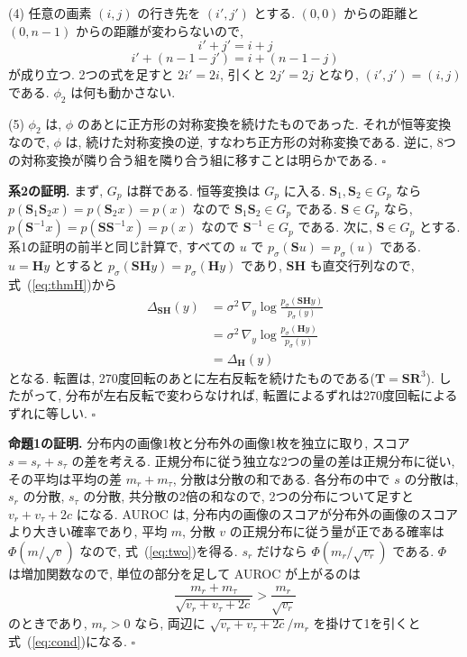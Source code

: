 \documentclass[MIRU,submit]{miru2025j}
\newcommand{\Tm}{\mathbf{T}}            %
\newcommand{\Hm}{\mathbf{H}}            %
\newcommand{\Sm}{\mathbf{S}}\newcommand{\Rm}{\mathbf{R}}\renewcommand{\Im}{\mathbf{I}}   %
\renewcommand{\eqref}[1]{(\ref{#1})}
\begin{document}
(4) 任意の画素 $(i,j)$ の行き先を $(i',j')$ とする. $(0,0)$ からの距離と $(0,n-1)$ からの距離が変わらないので,
\begin{equation}
i'+j'=i+j
\label{eq:t1a}
\end{equation}
\begin{equation}
i'+(n-1-j')=i+(n-1-j)
\label{eq:t1b}
\end{equation}
が成り立つ. 2つの式を足すと $2i'=2i$, 引くと $2j'=2j$ となり, $(i',j')=(i,j)$ である. $\phi_2$ は何も動かさない.

(5) $\phi_2$ は, $\phi$ のあとに正方形の対称変換を続けたものであった. それが恒等変換なので, $\phi$ は, 続けた対称変換の逆, すなわち正方形の対称変換である. 逆に, 8つの対称変換が隣り合う組を隣り合う組に移すことは明らかである. \hfill$\square$

\textbf{系2の証明.} まず, $G_p$ は群である. 恒等変換は $G_p$ に入る. $\Sm_1,\Sm_2\in G_p$ なら $p(\Sm_1\Sm_2x)=p(\Sm_2x)=p(x)$ なので $\Sm_1\Sm_2\in G_p$ である. $\Sm\in G_p$ なら, $p(\Sm^{-1}x)=p(\Sm\Sm^{-1}x)=p(x)$ なので $\Sm^{-1}\in G_p$ である. 次に, $\Sm\in G_p$ とする. 系1の証明の前半と同じ計算で, すべての $u$ で $p_\sigma(\Sm u)=p_\sigma(u)$ である. $u=\Hm y$ とすると $p_\sigma(\Sm\Hm y)=p_\sigma(\Hm y)$ であり, $\Sm\Hm$ も直交行列なので, 式~\eqref{eq:thmH}から
\begin{equation}
\begin{split}
\Delta_{\Sm\Hm}(y)&=\sigma^{2}\,\nabla_y\log\frac{p_\sigma(\Sm\Hm y)}{p_\sigma(y)}\\
&=\sigma^{2}\,\nabla_y\log\frac{p_\sigma(\Hm y)}{p_\sigma(y)}\\
&=\Delta_{\Hm}(y)
\end{split}
\label{eq:c2}
\end{equation}
となる. 転置は, 270度回転のあとに左右反転を続けたものである($\Tm=\Sm\Rm^{3}$). したがって, 分布が左右反転で変わらなければ, 転置によるずれは270度回転によるずれに等しい. \hfill$\square$

\textbf{命題1の証明.} 分布内の画像1枚と分布外の画像1枚を独立に取り, スコア $s=s_r+s_\tau$ の差を考える. 正規分布に従う独立な2つの量の差は正規分布に従い, その平均は平均の差 $m_r+m_\tau$, 分散は分散の和である. 各分布の中で $s$ の分散は, $s_r$ の分散, $s_\tau$ の分散, 共分散の2倍の和なので, 2つの分布について足すと $v_r+v_\tau+2c$ になる. AUROC は, 分布内の画像のスコアが分布外の画像のスコアより大きい確率であり, 平均 $m$, 分散 $v$ の正規分布に従う量が正である確率は $\Phi(m/\sqrt{v})$ なので, 式~\eqref{eq:two}を得る. $s_r$ だけなら $\Phi(m_r/\sqrt{v_r})$ である. $\Phi$ は増加関数なので, 単位の部分を足して AUROC が上がるのは
\begin{equation}
\frac{m_r+m_\tau}{\sqrt{v_r+v_\tau+2c}}>\frac{m_r}{\sqrt{v_r}}
\label{eq:p1a}
\end{equation}
のときであり, $m_r>0$ なら, 両辺に $\sqrt{v_r+v_\tau+2c}/m_r$ を掛けて1を引くと式~\eqref{eq:cond}になる. \hfill$\square$
\end{document}

